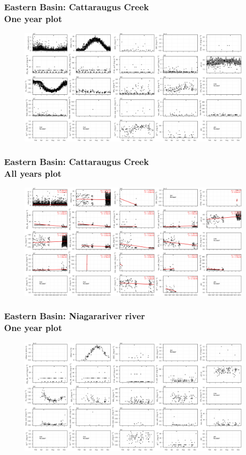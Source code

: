 \documentclass{beamer}
\begin{document}
\begin{frame}
\frametitle{Eastern Basin: Cattaraugus Creek\\ One year plot}
\begin{figure}
\includegraphics[width=\textwidth]{rivers/Eastern basin/plot_1yr cattarauguscreek.png}
\end{figure}
\end{frame}

\begin{frame}
\frametitle{Eastern Basin: Cattaraugus Creek\\ All years plot}
\begin{figure}
\includegraphics[width=\textwidth]{rivers/Eastern basin/plot_all cattarauguscreek.png}
\end{figure}
\end{frame}

\begin{frame}
\frametitle{Eastern Basin: Niagarariver river\\ One year plot}
\begin{figure}
\includegraphics[width=\textwidth]{rivers/Eastern basin/plot_1yr niagarariver.png}
\end{figure}
\end{frame}
\end{document}
